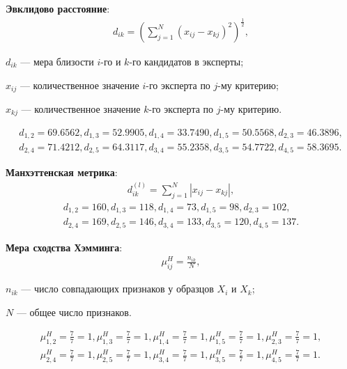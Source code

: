 \textbf{Эвклидово расстояние}:
\begin{align*}
	d_{ik} = (\sum^N_{j=1}(x_{ij} - x_{kj})^2)^{\frac{1}{2}},
\end{align*}
\begin{description}
	\item[где] $d_{ik}$ --- мера близости $i$-го и $k$-го кандидатов в эксперты;
	\item $x_{ij}$ --- количественное значение $i$-го эксперта по $j$-му критерию;
	\item $x_{kj}$ --- количественное значение $k$-го эксперта по $j$-му критерию.
\end{description}
\begin{align*}
	d_{1,2} = 69.6562,
	d_{1,3} = 52.9905,
	d_{1,4} = 33.7490,
	d_{1,5} = 50.5568,
	d_{2,3} = 46.3896, \\
	d_{2,4} = 71.4212,
	d_{2,5} = 64.3117,
	d_{3,4} = 55.2358,
	d_{3,5} = 54.7722,
	d_{4,5} = 58.3695.
\end{align*}

\textbf{Манхэттенская метрика}:
\begin{align*}
	d^{(l)}_{ik} = \sum^N_{j=1}|x_{ij} - x_{kj}|,
\end{align*}
\begin{align*}
	d_{1,2} = 160,
	d_{1,3} = 118,
	d_{1,4} = 73,
	d_{1,5} = 98,
	d_{2,3} = 102, \\
	d_{2,4} = 169,
	d_{2,5} = 146,
	d_{3,4} = 133,
	d_{3,5} = 120,
	d_{4,5} = 137.
\end{align*}

\textbf{Мера сходства Хэмминга}:
\begin{align*}
	\mu^H_{ij} = \frac{n_{ik}}{N},
\end{align*}
\begin{description}
	\item[где] $n_{ik}$ --- число совпадающих признаков у образцов $X_i$ и $X_k$;
	\item $N$ --- общее число признаков.
\end{description}
\begin{align*}
	\mu_{1,2}^H = \frac{7}{7} = 1,
	\mu_{1,3}^H = \frac{7}{7} = 1,
	\mu_{1,4}^H = \frac{7}{7} = 1,
	\mu_{1,5}^H = \frac{7}{7} = 1,
	\mu_{2,3}^H = \frac{7}{7} = 1, \\
	\mu_{2,4}^H = \frac{7}{7} = 1,
	\mu_{2,5}^H = \frac{7}{7} = 1,
	\mu_{3,4}^H = \frac{7}{7} = 1,
	\mu_{3,5}^H = \frac{7}{7} = 1,
	\mu_{4,5}^H = \frac{7}{7} = 1.
\end{align*}

